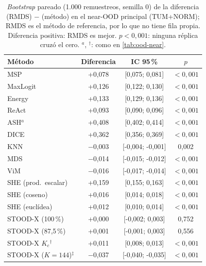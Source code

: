 \begin{table}
\centering
\footnotesize
\caption{\emph{Bootstrap} pareado (1.000 remuestreos, semilla 0) de la diferencia \AUROC(RMDS) $-$ \AUROC(método) en el near-OOD principal (TUM+NORM); RMDS es el método de referencia, por lo que no tiene fila propia. Diferencia positiva: RMDS es mejor. $p<0{,}001$: ninguna réplica cruzó el cero. $^{a}$, $^{\dagger}$: como en \cref{tab:ood-near}.}
\label{tab:ood-bootstrap-rmds}
\begin{tabular*}{\linewidth}{@{\extracolsep{\fill}}lccc}
\toprule
Método & Diferencia & IC 95\,\% & $p$ \\
\midrule
MSP & +0{,}078 & [0{,}075; 0{,}081] & $<0{,}001$ \\
MaxLogit & +0{,}126 & [0{,}122; 0{,}130] & $<0{,}001$ \\
Energy & +0{,}133 & [0{,}129; 0{,}136] & $<0{,}001$ \\
ReAct & +0{,}093 & [0{,}090; 0{,}096] & $<0{,}001$ \\
ASH$^{a}$ & +0{,}408 & [0{,}402; 0{,}414] & $<0{,}001$ \\
DICE & +0{,}362 & [0{,}356; 0{,}369] & $<0{,}001$ \\
KNN & $-$0{,}003 & [-0{,}004; -0{,}001] & 0{,}002 \\
MDS & $-$0{,}014 & [-0{,}015; -0{,}012] & $<0{,}001$ \\
ViM & $-$0{,}016 & [-0{,}017; -0{,}014] & $<0{,}001$ \\
SHE (prod.\ escalar) & +0{,}159 & [0{,}155; 0{,}163] & $<0{,}001$ \\
SHE (coseno) & +0{,}016 & [0{,}014; 0{,}018] & $<0{,}001$ \\
SHE (euclídea) & +0{,}012 & [0{,}010; 0{,}014] & $<0{,}001$ \\
STOOD-X (100\,\%) & +0{,}000 & [-0{,}002; 0{,}003] & 0{,}752 \\
STOOD-X (87,5\,\%) & +0{,}001 & [-0{,}001; 0{,}003] & 0{,}556 \\
STOOD-X $K_c$$^{\dagger}$ & +0{,}011 & [0{,}008; 0{,}013] & $<0{,}001$ \\
STOOD-X ($K=144$)$^{\ddagger}$ & $-$0{,}037 & [-0{,}040; -0{,}035] & $<0{,}001$ \\
\bottomrule
\end{tabular*}
\end{table}
